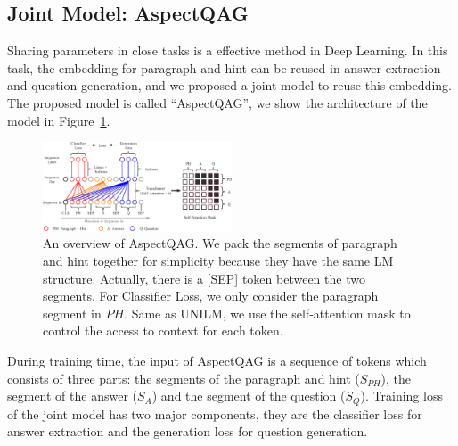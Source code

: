 \subsection{Joint Model: AspectQAG}

Sharing parameters in close tasks is a effective method in Deep Learning. In this task, the embedding for paragraph and hint can be reused in answer extraction and question generation, and we proposed a joint model to reuse this embedding. The proposed model is called ``AspectQAG'', we show the architecture of the model in Figure~\ref{fig:joint}.

\begin{figure}[th]
	\begin{center}
	\includegraphics[width=0.5\textwidth]{pic/joint-2.eps}
		\caption{\label{fig:joint} An overview of AspectQAG. We pack the segments of paragraph and hint together for simplicity because they have the same LM structure. Actually, there is a [SEP] token between the two segments. For Classifier Loss, we only consider the paragraph segment in $PH$. Same as UNILM, we use the self-attention mask to control the access to context for each token.}
	\end{center}
\end{figure}


During training time, the input of AspectQAG is a sequence of tokens which consists of three parts: the segments of the paragraph and hint ($S_{PH}$), the segment of the answer ($S_{A}$) and the segment of the question ($S_{Q}$). 
Training loss of the joint model has two major components, they are the classifier loss for answer extraction and the generation loss for question generation.

